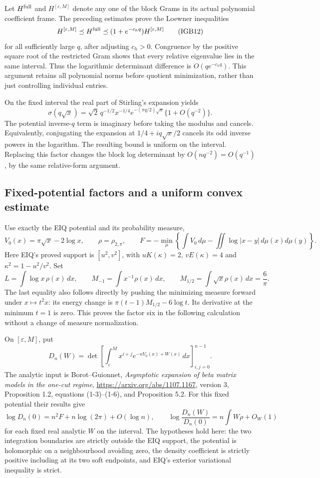 Let $H^{\rm full}$ and $H^{[\varepsilon,M]}$ denote any one of
the block Grams in its actual polynomial coefficient frame.
The preceding estimates prove the Loewner inequalities
\[
 H^{[\varepsilon,M]}\preceq H^{\rm full}
 \preceq(1+e^{-c_hq})H^{[\varepsilon,M]}
 \tag{IGB12}
\]
for all sufficiently large $q$, after adjusting $c_h>0$.
Congruence by the positive square root of the restricted Gram
shows that every relative eigenvalue lies in the same interval.
Thus the logarithmic determinant difference is
$O(qe^{-c_hq})$. This argument retains all polynomial norms
before quotient minimization, rather than just controlling
individual entries.

On the fixed interval the real part of Stirling's expansion yields
\[
 \sigma(q\sqrt{x})=
 \sqrt2\,q^{-1/2}x^{-1/4}
 e^{-(\pi q/2)\sqrt{x}}\{1+O(q^{-2})\}.
 \tag{IGB13}
\]
The potential inverse-$q$ term is imaginary before taking the
modulus and cancels. Equivalently, conjugating the expansion
at $1/4+iq\sqrt{x}/2$ cancels its odd inverse powers in the
logarithm. The resulting bound is uniform on the interval.
Replacing this factor changes the block log determinant by
$O(nq^{-2})=O(q^{-1})$, by the same relative-form argument.

\subsection{Fixed-potential factors and a uniform convex estimate}

Use exactly the EIQ potential and its probability measure,
\[
 V_0(x)=\pi\sqrt{x}-2\log x,\qquad
 \rho=\rho_{2,\pi},\qquad
 F=-\min_\mu\left\{\int V_0\,d\mu-
                    \iint\log|x-y|\,d\mu(x)d\mu(y)\right\}.
 \tag{IGB14}
\]
Here EIQ's proved support is $[u^2,v^2]$, with
$uK(\kappa)=2$, $vE(\kappa)=4$ and
$\kappa^2=1-u^2/v^2$. Set
\[
 L=\int\log x\,\rho(x)\,dx,\qquad
 M_{-1}=\int x^{-1}\rho(x)\,dx,\qquad
 M_{1/2}=\int\sqrt{x}\rho(x)\,dx=\frac6\pi .
 \tag{IGB15}
\]
The last equality also follows directly by pushing the minimizing
measure forward under $x\mapsto t^2x$: its energy change is
$\pi(t-1)M_{1/2}-6\log t$. Its derivative at the minimum
$t=1$ is zero. This proves the factor six in the following
calculation without a change of measure normalization.

On $[\varepsilon,M]$, put
\[
 D_n(W)=\det\left[
 \int_\varepsilon^M x^{i+j}e^{-nV_0(x)+W(x)}\,dx
                         \right]_{i,j=0}^{n-1}.
 \tag{IGB16}
\]
The analytic input is Borot--Guionnet,
\emph{Asymptotic expansion of beta matrix models in the one-cut regime},
\url{https://arxiv.org/abs/1107.1167}, version 3,
Proposition 1.2, equations (1-3)--(1-6), and Proposition 5.2.
For this fixed potential their results give
\[
 \log D_n(0)=n^2F+n\log(2\pi)+O(\log n),\qquad
 \log\frac{D_n(W)}{D_n(0)}
       =n\int W\rho+O_W(1)
 \tag{IGB17}
\]
for each fixed real analytic $W$ on the interval.
The hypotheses hold here: the two integration boundaries are
strictly outside the EIQ support, the potential is holomorphic
on a neighbourhood avoiding zero, the density coefficient is
strictly positive including at its two soft endpoints, and EIQ's
exterior variational inequality is strict.

